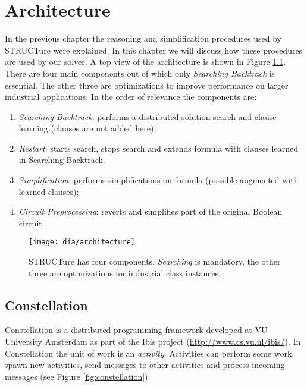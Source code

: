 \chapter{Architecture}
\label{chap:architecture}

In the previous chapter the reasoning and simplification procedures
used by STRUCTure were explained. In this chapter we will discuss
how these procedures are used by our solver.  A top view of the
architecture is shown in Figure \ref{fig:architecture}. There are
four main components out of which only \emph{Searching Backtrack} is
essential.  The other three are optimizations to improve performance
on larger industrial applications. In the order of relevance the
components are:

\begin{enumerate}
  \item \emph{Searching Backtrack}: performs a distributed solution search
  and clause learning (clauses are not added here);
  \item \emph{Restart}: starts search, stops search and extends
  formula with clauses learned in Searching Backtrack.
  \item \emph{Simplification}: performs simplifications on formula (possible
  augmented with learned clauses);
  \item \emph{Circuit Preprocessing}: reverts and simplifies 
  part of the original Boolean circuit.
\end{enumerate}

\begin{figure}
  \centering
  \texttt{[image: dia/architecture]}
  \caption{STRUCTure has four components. \emph{Searching}
  is mandatory, the other three are optimizations
  for industrial class instances.}
  \label{fig:architecture}
\end{figure}


\section{Constellation}
\label{sec:constellation}

Constellation is a distributed programming framework developed at
VU University Amsterdam \cite{mine:constellation} as part of the
Ibis project (\url{http://www.cs.vu.nl/ibis/}).  In Constellation
the unit of work is an \emph{activity}. Activities can perform some work,
spawn new activities, send messages to other activities and process
incoming messages (see Figure \ref{fig:constellation}).

